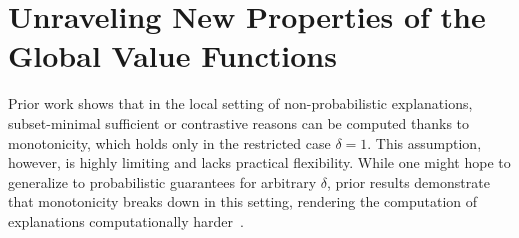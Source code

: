 \documentclass{article}
\newtheorem{definition}{Definition}
\begin{document}




\section{Unraveling New Properties of the Global Value Functions}

Prior work shows that in the local setting of non-probabilistic explanations, subset-minimal sufficient or contrastive reasons can be computed thanks to monotonicity, which holds only in the restricted case $\delta=1$. This assumption, however, is highly limiting and lacks practical flexibility. While one might hope to generalize to probabilistic guarantees for arbitrary $\delta$, prior results demonstrate that monotonicity breaks down in this setting, rendering the computation of explanations computationally harder~\citep{arenas2022computing, kozachinskiy2023inapproximability, izza2023computing, subercaseaux2024probabilistic, izza2024locally}.

\end{document}
